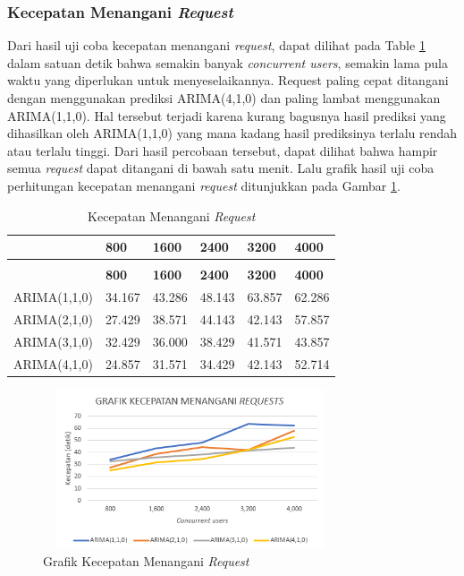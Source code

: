 \subsubsection{Kecepatan Menangani \textit{Request}}
Dari hasil uji coba kecepatan menangani \textit{request}, dapat dilihat pada Table \ref{kecepatanrequest} dalam satuan detik bahwa semakin banyak \textit{concurrent users}, semakin lama pula waktu yang diperlukan untuk menyeselaikannya. Request paling cepat ditangani dengan menggunakan prediksi ARIMA(4,1,0) dan paling lambat menggunakan ARIMA(1,1,0). Hal tersebut terjadi karena kurang bagusnya hasil prediksi yang dihasilkan oleh ARIMA(1,1,0) yang mana kadang hasil prediksinya terlalu rendah atau terlalu tinggi.
Dari hasil percobaan tersebut, dapat dilihat bahwa hampir semua \textit{request} dapat ditangani di bawah satu menit. Lalu grafik hasil uji coba perhitungan kecepatan menangani \textit{request} ditunjukkan pada Gambar \ref{grunningtime}.
\begin{longtable}{|p{}|p{}|p{}|p{}|p{}|p{}|}
	\caption{Kecepatan Menangani \textit{Request}} \label{kecepatanrequest} \\
	\hline
	& \textbf{800} & \textbf{1600} & \textbf{2400} & \textbf{3200} & \textbf{4000} \\ \hline
	\endfirsthead
	\caption[]{Kecepatan Menangani \textit{Request}} \\
	\hline
	& \textbf{800} & \textbf{1600} & \textbf{2400} & \textbf{3200} & \textbf{4000} \\ \hline
	\endhead
	\endfoot
	\endlastfoot
	
	ARIMA(1,1,0) & 34.167 & 43.286 & 48.143 & 63.857 & 62.286 \\ \hline
	ARIMA(2,1,0) & 27.429 & 38.571 & 44.143 & 42.143 & 57.857 \\ \hline
	ARIMA(3,1,0) & 32.429 & 36.000 & 38.429 & 41.571 & 43.857 \\ \hline
	ARIMA(4,1,0) & 24.857 & 31.571 & 34.429 & 42.143 & 52.714 \\ \hline
\end{longtable}

\begin{figure}[H]
	\centering
	\includegraphics[width=8.7cm,height=4.7cm]{Images/C-5/runningtime.png}
	\caption{Grafik Kecepatan Menangani \textit{Request}}
	\label{grunningtime}
\end{figure}

